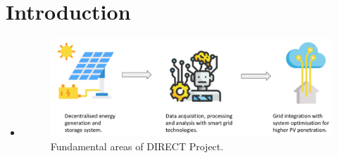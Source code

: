 \section{Introduction}

\begin{frame}[c]{}

\begin{itemize}
        \item<only@1>[] 
            \begin{figure}
                \centering
                \includegraphics[width=1\linewidth]{Figures/DIRECT_Project.png}
                \caption{Fundamental areas of DIRECT Project.}
            \end{figure}


\end{itemize}
\end{frame}
